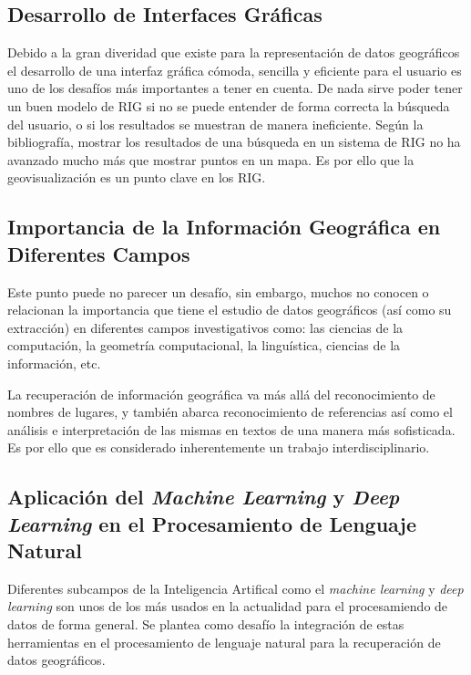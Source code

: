 \documentclass{llncs}
\begin{document}
\subsection{Desarrollo de Interfaces Gráficas}\label{sec:gui}

Debido a la gran diveridad que existe para la representación de datos
geográficos el desarrollo de una interfaz gráfica cómoda, sencilla y eficiente
para el usuario es uno de los desafíos más importantes a tener en cuenta. De
nada sirve poder tener un buen modelo de RIG si no se puede entender de forma
correcta la búsqueda del usuario, o si los resultados se muestran de manera
ineficiente. Según la bibliografía, mostrar los resultados de una búsqueda en
un sistema de RIG no ha avanzado mucho más que mostrar puntos en un mapa. Es
por ello que la geovisualización es un punto clave en los RIG.


\subsection{Importancia de la Información Geográfica en Diferentes
Campos}\label{sec:import}

Este punto puede no parecer un desafío, sin embargo, muchos no conocen o relacionan
la importancia que tiene el estudio de datos geográficos (así como su extracción)
en diferentes campos investigativos como: las ciencias de la computación, la 
geometría computacional, la linguística, ciencias de la información, etc.

La recuperación de información geográfica va más allá del reconocimiento de
nombres de lugares, y también abarca reconocimiento de referencias así como el
análisis e interpretación de las mismas en textos de una manera más
sofisticada. Es por ello que es considerado inherentemente un trabajo
interdisciplinario.

\subsection{Aplicación del \emph{Machine Learning} y \emph{Deep Learning} en el
Procesamiento de Lenguaje Natural}\label{sec:ml}

Diferentes subcampos de la Inteligencia Artifical como el \emph{machine
learning} y \emph{deep learning} son unos de los más usados en la actualidad
para el procesamiendo de datos de forma general. Se plantea como desafío la
integración de estas herramientas en el procesamiento de lenguaje natural para
la recuperación de datos geográficos.
\end{document}
